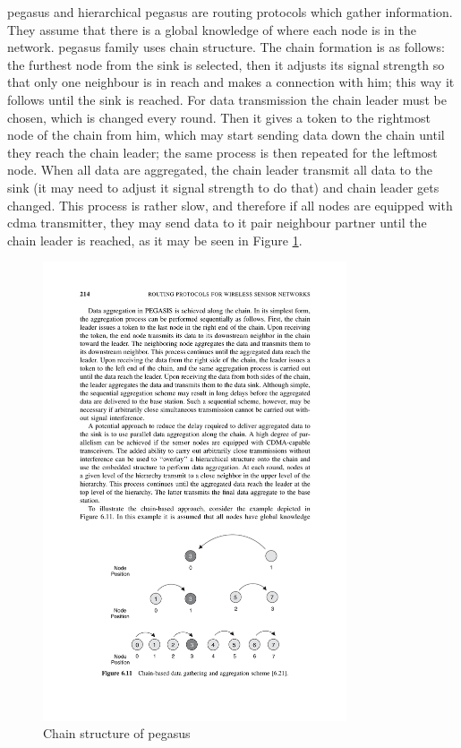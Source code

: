 \acrfull{pegasus} and hierarchical \acrshort{pegasus} are routing protocols which gather information. They assume that there is a global knowledge of where each node is in the network. \acrshort{pegasus} family uses chain structure. The chain formation is as follows: the furthest node from the sink is selected, then it adjusts its signal strength so that only one neighbour is in reach and makes a connection with him; this way it follows until the sink is reached. For data transmission the chain leader must be chosen, which is changed every round. Then it gives a token to the rightmost node of the chain from him, which may start sending data down the chain until they reach the chain leader; the same process is then repeated for the leftmost node. When all data are aggregated, the chain leader transmit all data to the sink (it may need to adjust it signal strength to do that) and chain leader gets changed. This process is rather slow, and therefore if all nodes are equipped with \acrshort{cdma} transmitter, they may send data to it pair neighbour partner until the chain leader is reached, as it may be seen in Figure \ref{fig:chain-pegasis}.

\begin{figure}[ht]
    \centering
    \includegraphics[width=0.8\textwidth]{00images/chain-pegasis}
    \caption{Chain structure of \acrshort{pegasus}}
    \label{fig:chain-pegasis}
\end{figure}

